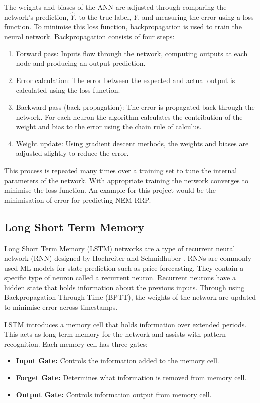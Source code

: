 The weights and biases of the ANN are adjusted through comparing the network’s prediction, $\hat{Y}$, to the true label, $Y$, and measuring the error using a loss function. To minimise this loss function, backpropagation is used to train the neural network. Backpropagation consists of four steps:
\begin{enumerate}
    \item Forward pass: Inputs flow through the network, computing outputs at each node and producing an output prediction.
    \item Error calculation: The error between the expected and actual output is calculated using the loss function.
    \item Backward pass (back propagation): The error is propagated back through the network. For each neuron the algorithm calculates the contribution of the weight and bias to the error using the chain rule of calculus.
    \item Weight update: Using gradient descent methods, the weights and biases are adjusted slightly to reduce the error.
\end{enumerate}

This process is repeated many times over a training set to tune the internal parameters of the network. With appropriate training the network converges to minimise the loss function. An example for this project would be the minimisation of error for predicting NEM RRP.

\subsection{Long Short Term Memory}
Long Short Term Memory (LSTM) networks are a type of recurrent neural network (RNN) designed by Hochreiter and Schmidhuber \cite{Hochreiter1997}. RNNs are commonly used ML models for state prediction such as price forecasting. They contain a specific type of neuron called a  recurrent neuron. Recurrent neurons have a hidden state that holds information about the previous inputs. Through using Backpropagation Through Time (BPTT), the weights of the network are updated to minimise error across timestamps.

LSTM introduces a memory cell that holds information over extended periods. This acts as long-term memory for the network and assists with pattern recognition. Each memory cell has three gates:
\begin{itemize}
    \item \textbf{Input Gate:} Controls the information added to the memory cell.
    \item \textbf{Forget Gate:} Determines what information is removed from memory cell.
    \item \textbf{Output Gate:} Controls information output from memory cell.
\end{itemize}


